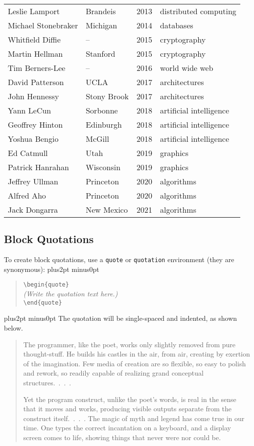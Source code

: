 \documentclass[doublespacing]{utdthesis}
\let\cite=\citep
\newenvironment{exampleclasscode}
 {\parindent=1cm\vskip0pt plus2pt minus0pt\begin{verse}}
 {\end{verse}\vskip0pt plus2pt minus0pt}
\begin{document}
\begin{table}[p]
\begin{center}
\begin{tabular}{llcp{2.5in}}
  Leslie Lamport & Brandeis & 2013 & distributed computing \\
  Michael Stonebraker & Michigan & 2014 & databases \\
  Whitfield Diffie & -- & 2015 & cryptography \\
  Martin Hellman & Stanford & 2015 & cryptography \\
  Tim Berners-Lee & -- & 2016 & world wide web \\
  David Patterson & UCLA & 2017 & architectures \\
  John Hennessy & Stony Brook & 2017 & architectures \\
  Yann LeCun & Sorbonne & 2018 & artificial intelligence \\
  Geoffrey Hinton & Edinburgh & 2018 & artificial intelligence \\
  Yoshua Bengio & McGill & 2018 & artificial intelligence \\
  Ed Catmull & Utah & 2019 & graphics \\
  Patrick Hanrahan & Wisconsin & 2019 & graphics \\
  Jeffrey Ullman & Princeton & 2020 & algorithms \\
  Alfred Aho & Princeton & 2020 & algorithms \\
  Jack Dongarra & New Mexico & 2021 & algorithms \\
  \hline
  \end{tabular}
  \end{center}
\end{table}

\subsection{Block Quotations}
\label{s:quotes}

To create block quotations, use a \texttt{quote} or \texttt{quotation}
environment (they are synonymous):
\begin{exampleclasscode}
\verb|\begin{quote}| \\
\textit{(Write the quotation text here.)} \\
\verb|\end{quote}|
\end{exampleclasscode}
The quotation will be single-spaced and indented, as shown below.
\begin{quote}
The programmer, like the poet, works only slightly removed from pure
thought-stuff.
He builds his castles in the air, from air, creating by exertion of the
imagination.
Few media of creation are so flexible, so easy to polish and rework, so
readily capable of realizing grand conceptual structures.~.~.~.

Yet the program construct, unlike the poet's words, is real in the sense that
it moves and works, producing visible outputs separate from the construct
itself.~.~.~.
The magic of myth and legend has come true in our time.
One types the correct incantation on a keyboard, and a display screen comes to
life, showing things that never were nor could be.~\cite{brooks}
\end{quote}
\end{document}
